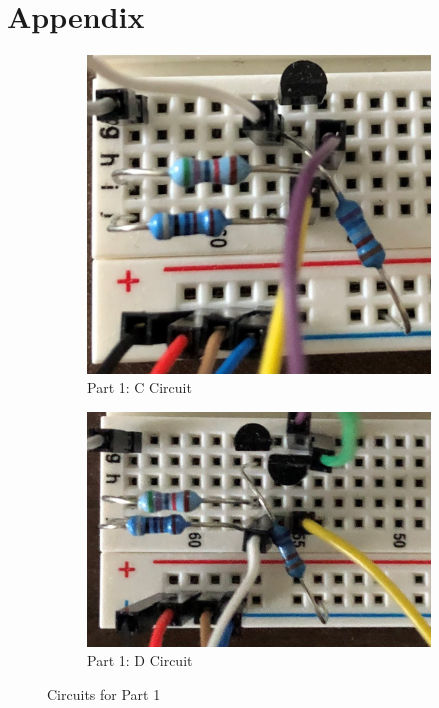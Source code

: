 \documentclass[12pt]{article}
\begin{document}
\section*{Appendix}
\begin{figure}[!ht]
    \centering
    \begin{subfigure}[b]{0.33\textwidth}
        \centering
        \includegraphics[width=\textwidth]{Part1A}
        \caption{Part 1: C Circuit}
    \end{subfigure}
    \begin{subfigure}[b]{0.45\textwidth}
        \centering
        \includegraphics[width=\textwidth]{Part1B}
        \caption{Part 1: D Circuit}
    \end{subfigure}
    \caption{Circuits for Part 1}
\end{figure}
\end{document}

